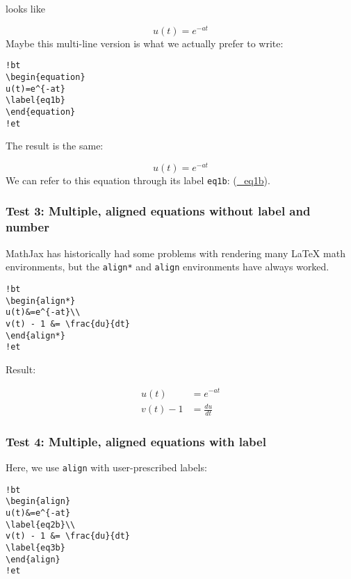 \documentclass[]{article}
\begin{document}
looks like

\[
\begin{equation} u(t)=e^{-at} \label{_eq1a}\end{equation}
\] Maybe this multi-line version is what we actually prefer to write:

\begin{verbatim}
!bt
\begin{equation}
u(t)=e^{-at}
\label{eq1b}
\end{equation}
!et
\end{verbatim}

The result is the same:

\[
\begin{equation}
u(t)=e^{-at} \label{_eq1b}
\end{equation}
\] We can refer to this equation through its label \texttt{eq1b}:
(\protect\hyperlink{ux5feq1b}{\_eq1b}).

\subsubsection{Test 3: Multiple, aligned equations without label and
number}\label{test-3-multiple-aligned-equations-without-label-and-number}

MathJax has historically had some problems with rendering many LaTeX
math environments, but the \texttt{align*} and \texttt{align}
environments have always worked.

\begin{verbatim}
!bt
\begin{align*}
u(t)&=e^{-at}\\ 
v(t) - 1 &= \frac{du}{dt}
\end{align*}
!et
\end{verbatim}

Result:

\[
\begin{align*}
u(t)&=e^{-at}\\ 
v(t) - 1 &= \frac{du}{dt}
\end{align*}
\]

\subsubsection{Test 4: Multiple, aligned equations with
label}\label{test-4-multiple-aligned-equations-with-label}

Here, we use \texttt{align} with user-prescribed labels:

\begin{verbatim}
!bt
\begin{align}
u(t)&=e^{-at}
\label{eq2b}\\ 
v(t) - 1 &= \frac{du}{dt}
\label{eq3b}
\end{align}
!et
\end{verbatim}
\end{document}
